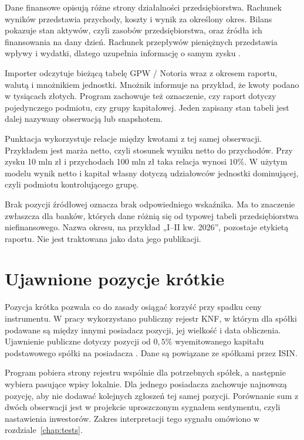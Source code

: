 \documentclass[12pt,a4paper,twoside]{report}
\begin{document}
Dane finansowe opisują różne strony działalności przedsiębiorstwa. Rachunek wyników przedstawia przychody, koszty i wynik za określony okres. Bilans pokazuje stan aktywów, czyli zasobów przedsiębiorstwa, oraz źródła ich finansowania na dany dzień. Rachunek przepływów pieniężnych przedstawia wpływy i wydatki, dlatego uzupełnia informację o samym zysku \cite{statements}.

Importer odczytuje bieżącą tabelę GPW / Notoria wraz z okresem raportu, walutą i mnożnikiem jednostki. Mnożnik informuje na przykład, że kwoty podano w tysiącach złotych. Program zachowuje też oznaczenie, czy raport dotyczy pojedynczego podmiotu, czy grupy kapitałowej. Jeden zapisany stan tabeli jest dalej nazywany obserwacją lub snapshotem.

Punktacja wykorzystuje relacje między kwotami z tej samej obserwacji. Przykładem jest marża netto, czyli stosunek wyniku netto do przychodów. Przy zysku 10 mln zł i przychodach 100 mln zł taka relacja wynosi $10\%$. W użytym modelu wynik netto i kapitał własny dotyczą udziałowców jednostki dominującej, czyli podmiotu kontrolującego grupę.

Brak pozycji źródłowej oznacza brak odpowiedniego wskaźnika. Ma to znaczenie zwłaszcza dla banków, których dane różnią się od typowej tabeli przedsiębiorstwa niefinansowego. Nazwa okresu, na przykład „I--II kw. 2026”, pozostaje etykietą raportu. Nie jest traktowana jako data jego publikacji.

\section{Ujawnione pozycje krótkie}

Pozycja krótka pozwala co do zasady osiągać korzyść przy spadku ceny instrumentu. W pracy wykorzystano publiczny rejestr KNF, w którym dla spółki podawane są między innymi posiadacz pozycji, jej wielkość i data obliczenia. Ujawnienie publiczne dotyczy pozycji od $0{,}5\%$ wyemitowanego kapitału podstawowego spółki na posiadacza \cite{knfshorts}. Dane są powiązane ze spółkami przez ISIN.

Program pobiera strony rejestru wspólnie dla potrzebnych spółek, a następnie wybiera pasujące wpisy lokalnie. Dla jednego posiadacza zachowuje najnowszą pozycję, aby nie dodawać kolejnych zgłoszeń tej samej pozycji. Porównanie sum z dwóch obserwacji jest w projekcie uproszczonym sygnałem sentymentu, czyli nastawienia inwestorów. Zakres interpretacji tego sygnału omówiono w rozdziale~\ref{chap:tests}.
\end{document}
